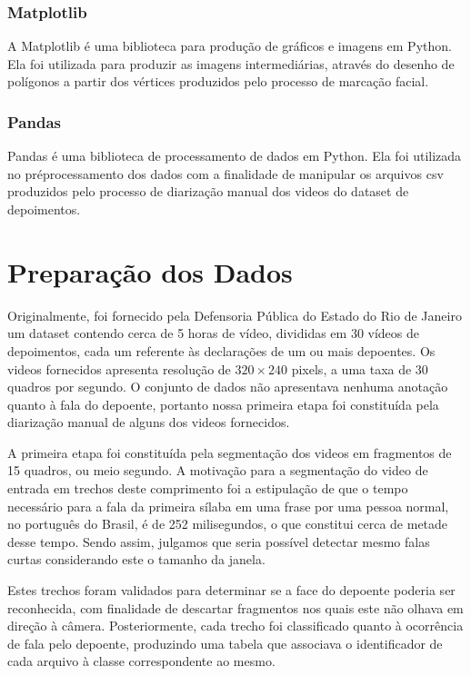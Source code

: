 \subsubsection{Matplotlib}

A Matplotlib\cite{Hunter:2007} é uma biblioteca para produção de gráficos e imagens em Python. Ela foi utilizada para produzir as imagens intermediárias, através do desenho de polígonos a partir dos vértices produzidos pelo processo de marcação facial.

\subsubsection{Pandas}

Pandas\cite{mckinney-proc-scipy-2010} é uma biblioteca de processamento de dados em Python. Ela foi utilizada no préprocessamento dos dados com a finalidade de manipular os arquivos csv produzidos pelo processo de diarização manual dos videos do dataset de depoimentos.

\section{Preparação dos Dados}
\label{sec:preproc}

Originalmente, foi fornecido pela Defensoria Pública do Estado do Rio de Janeiro um dataset contendo cerca de 5 horas de vídeo, divididas em 30 vídeos de depoimentos, cada um referente às declarações de um ou mais depoentes. Os videos fornecidos apresenta resolução de $320\times240$ pixels, a uma taxa de 30 quadros por segundo. O conjunto de dados não apresentava nenhuma anotação quanto à fala do depoente, portanto nossa primeira etapa foi constituída pela diarização manual de alguns dos videos fornecidos.

A primeira etapa foi constituída pela segmentação dos videos em fragmentos de 15 quadros, ou meio segundo. A motivação para a segmentação do video de entrada em trechos deste comprimento foi a estipulação de que o tempo necessário para a fala da primeira sílaba em uma frase por uma pessoa normal, no português do Brasil, é de 252 milisegundos\cite{barbosaSyllabletimingBrazilianPortuguese2000}, o que constitui cerca de metade desse tempo. Sendo assim, julgamos que seria possível detectar mesmo falas curtas considerando este o tamanho da janela.

Estes trechos foram validados para determinar se a face do depoente poderia ser reconhecida, com finalidade de descartar fragmentos nos quais este não olhava em direção à câmera. Posteriormente, cada trecho foi classificado quanto à ocorrência de fala pelo depoente, produzindo uma tabela que associava o identificador de cada arquivo à classe correspondente ao mesmo.

